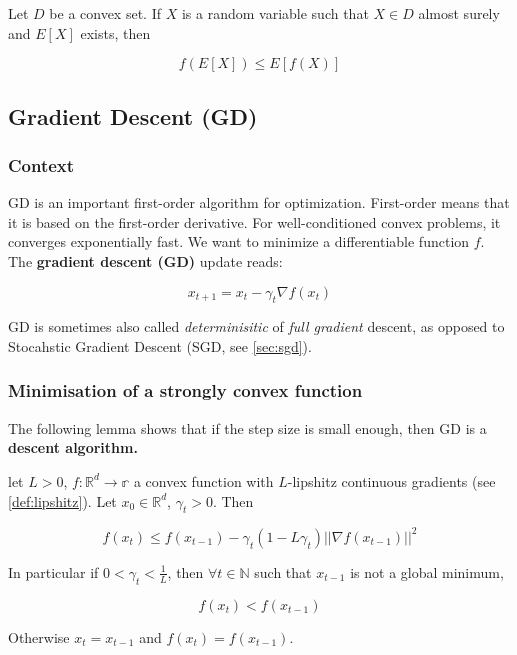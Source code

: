 \documentclass[
10pt, %
a4paper, %
oneside, %
headinclude,footinclude, %
BCOR5mm, %
]{scrartcl}
\begin{document}
Let $D$ be a convex set. If $X$ is a random variable such that $ X\in D$ almost surely and $ E[X]$ exists, then

\begin{equation*}
    f(E[X])\leq E[f(X)]
\end{equation*}

\subsection{\large\color{MidnightBlue}Gradient Descent (GD)}

\subsubsection{\large\color{Periwinkle}Context}

GD is an important first-order algorithm for optimization. First-order means that it is based on the first-order derivative. For well-conditioned convex problems, it converges exponentially fast. We want to minimize a differentiable function $f$. The \textbf{{gradient descent (GD)}}  update reads:

\begin{equation*}
    x_{t+1} = x_t - \gamma_t \nabla f(x_t)
\end{equation*}

GD is sometimes also called \textit{{determinisitic}} of \textit{{full
gradient}} descent, as opposed to Stocahstic Gradient Descent (SGD, see \ref{sec:sgd}).

\subsubsection{\large\color{Periwinkle}Minimisation of a strongly convex function}

The following lemma shows that if the step size is small enough, then GD is a \textbf{{descent algorithm.}} 

\begin{lemma}
    let $L>0$, $f: \mathbb{R}^d\rightarrow \mathbb{r} $ a convex function with $L$-lipshitz continuous gradients (see \ref{def:lipshitz}). Let $x_0\in \mathbb{R}^d$, $\gamma_t >0$. Then

    \begin{equation*}
	f(x_t)\leq f(x_{t-1})-\gamma_t (1-L\gamma_t) ||\nabla f(x_{t-1})||^2
    \end{equation*}

    In particular if $0<  \gamma_t < \frac{1}{L} $, then $ \forall t\in \mathbb{N} $ such that $ x_{t-1}$ is not a global minimum,

    \begin{equation*}
	f(x_t)<f(x_{t-1})
    \end{equation*}

    Otherwise $x_t = x_{t-1}$ and $f(x_t) = f(x_{t-1})$.
\end{lemma}
\end{document}
